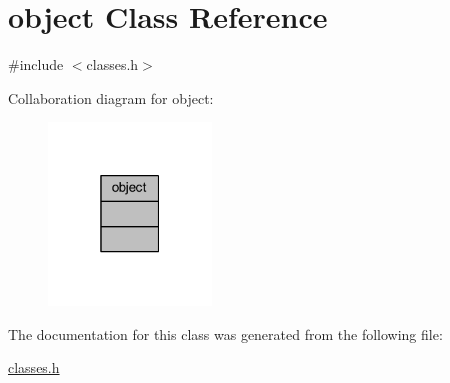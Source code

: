 \hypertarget{classobject}{}\section{object Class Reference}
\label{classobject}


{\ttfamily \#include $<$classes.\+h$>$}



Collaboration diagram for object\+:
\nopagebreak
\begin{figure}[H]
\begin{center}
\leavevmode
\includegraphics[width=123pt]{classobject__coll__graph}
\end{center}
\end{figure}


The documentation for this class was generated from the following file\+:\begin{DoxyCompactItemize}
\item 
\mbox{\hyperlink{classes_8h}{classes.\+h}}\end{DoxyCompactItemize}

